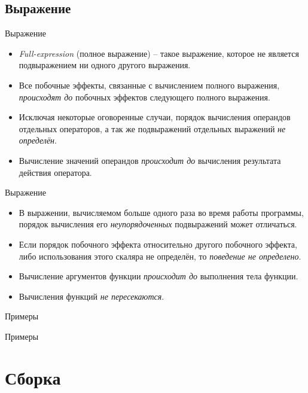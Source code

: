     \subsection{Выражение}
    \begin{frame}{Выражение}
        \begin{itemize}
            \item \textit{Full-expression} (полное выражение) -- такое выражение, которое не является подвыражением ни одного другого выражения.
            \item Все побочные эффекты, связанные с вычислением полного выражения, \textit{происходят до} побочных эффектов следующего полного выражения.
            \item Исключая некоторые оговоренные случаи, порядок вычисления операндов отдельных операторов, а так же подвыражений отдельных выражений \textit{не определён}.
            \item Вычисление значений операндов \textit{происходит до} вычисления результата действия оператора.
        \end{itemize}
    \end{frame}
    \begin{frame}{Выражение}
        \begin{itemize}
            \item В выражении, вычисляемом больше одного раза во время работы программы, порядок вычисления его \textit{неупорядоченных} подвыражений может отличаться.
            \item Если порядок побочного эффекта относительно другого побочного эффекта, либо использования этого скаляра не определён, то \textit{поведение не определено}.
            \item Вычисление аргументов функции \textit{происходит до } выполнения тела функции.
            \item Вычисления функций \textit{не пересекаются}.
        \end{itemize}
    \end{frame}
    \begin{frame}{Примеры}
        
    \end{frame}
    \begin{frame}{Примеры}
        
    \end{frame}

    \section{Сборка}
